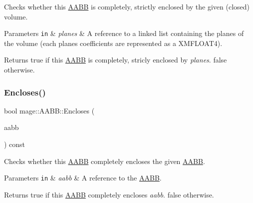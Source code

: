 Checks whether this \hyperlink{structmage_1_1_a_a_b_b}{A\+A\+BB} is completely, strictly enclosed by the given (closed) volume.


\begin{DoxyParams}[1]{Parameters}
\mbox{\tt in}  & {\em planes} & A reference to a linked list containing the planes of the volume (each plane\textquotesingle{}s coefficients are represented as a {\ttfamily X\+M\+F\+L\+O\+A\+T4}). \\
\hline
\end{DoxyParams}
\begin{DoxyReturn}{Returns}
{\ttfamily true} if this \hyperlink{structmage_1_1_a_a_b_b}{A\+A\+BB} is completely, stricly enclosed by {\itshape planes}. {\ttfamily false} otherwise. 
\end{DoxyReturn}
\hypertarget{structmage_1_1_a_a_b_b_a0d6619404376bacf956b4a0c6662696f}{}\label{structmage_1_1_a_a_b_b_a0d6619404376bacf956b4a0c6662696f} 
\subsubsection{\texorpdfstring{Encloses()}{Encloses()}\hspace{0.1cm}{\footnotesize\ttfamily [1/2]}}
{\footnotesize\ttfamily bool mage\+::\+A\+A\+B\+B\+::\+Encloses (\begin{DoxyParamCaption}\item[{const \hyperlink{structmage_1_1_a_a_b_b}{A\+A\+BB} \&}]{aabb }\end{DoxyParamCaption}) const}

Checks whether this \hyperlink{structmage_1_1_a_a_b_b}{A\+A\+BB} completely encloses the given \hyperlink{structmage_1_1_a_a_b_b}{A\+A\+BB}.


\begin{DoxyParams}[1]{Parameters}
\mbox{\tt in}  & {\em aabb} & A reference to the \hyperlink{structmage_1_1_a_a_b_b}{A\+A\+BB}. \\
\hline
\end{DoxyParams}
\begin{DoxyReturn}{Returns}
{\ttfamily true} if this \hyperlink{structmage_1_1_a_a_b_b}{A\+A\+BB} completely encloses {\itshape aabb}. {\ttfamily false} otherwise. 
\end{DoxyReturn}
\hypertarget{structmage_1_1_a_a_b_b_a67d1820b5ee787f02e6cfd593aca35fd}{}\label{structmage_1_1_a_a_b_b_a67d1820b5ee787f02e6cfd593aca35fd} 
